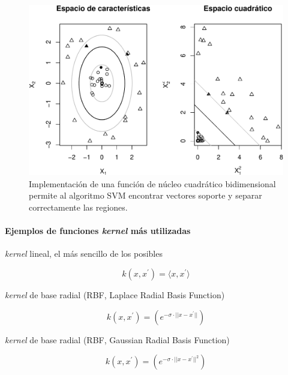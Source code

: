 \documentclass[12pt,spanish,a4paper]{article}
\let\oldparagraph\paragraph
\renewcommand{\paragraph}[1]{\oldparagraph{#1}\mbox{}}
\numberwithin{equation}{section}
\begin{document}
\begin{figure}[h]

{\centering \includegraphics[width=0.95\linewidth]{graphics/svm/kernel_cuadratico-1} 

}

\caption{Implementación de una función de núcleo cuadrático bidimensional permite al algoritmo SVM encontrar vectores soporte y separar correctamente las regiones.}\label{fig:kernel_cuadratico}
\end{figure}

\paragraph{\texorpdfstring{Ejemplos de funciones \emph{kernel} más
utilizadas}{Ejemplos de funciones kernel más utilizadas}}\label{ejemplos-de-funciones-kernel-mas-utilizadas}

\emph{kernel} lineal, el más sencillo de los posibles

\begin{equation}
k\left(x, x^{\prime}\right) = \langle x, x^{\prime}\rangle
\end{equation}

\emph{kernel} de base radial (RBF, Laplace Radial Basis Function)

\begin{equation}
k\left(x, x^{\prime}\right) = \left( e^{-\sigma\cdot ||x - x^{\prime}||}\right)
\end{equation}

\emph{kernel} de base radial (RBF, Gaussian Radial Basis Function)

\begin{equation}
k\left(x, x^{\prime}\right) = \left( e^{-\sigma\cdot ||x - x^{\prime}||^{2}}\right)
\end{equation}
\end{document}
